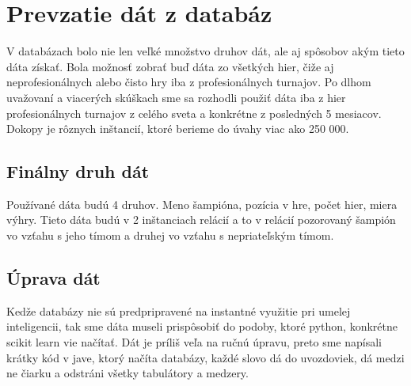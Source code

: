 \section{Prevzatie dát z databáz}
V databázach bolo nie len veľké množstvo druhov dát, ale aj spôsobov akým tieto dáta získať. Bola možnosť zobrať buď dáta zo všetkých hier, čiže aj neprofesionálnych alebo čisto hry iba z profesionálnych turnajov. Po dlhom uvažovaní a viacerých skúškach sme sa rozhodli použiť dáta iba z hier profesionálnych turnajov z celého sveta a konkrétne z posledných 5 mesiacov. Dokopy je rôznych inštancií, ktoré berieme do úvahy viac ako 250 000.

\subsection{Finálny druh dát}
Používané dáta budú 4 druhov. Meno šampióna, pozícia v hre, počet hier, miera výhry. Tieto dáta budú v 2 inštanciach relácií a to v relácií pozorovaný šampión vo vzťahu s jeho tímom a druhej vo vzťahu s nepriateľským tímom.

\subsection{Úprava dát}
Kedže databázy nie sú predpripravené na instantné využitie pri umelej inteligencii, tak sme dáta museli prispôsobiť do podoby, ktoré python, konkrétne scikit learn vie načítať. Dát je príliš veľa na ručnú úpravu, preto sme napísali krátky kód v jave, ktorý načíta databázy, každé slovo dá do uvozdoviek, dá medzi ne čiarku a odstráni všetky tabulátory a medzery.

